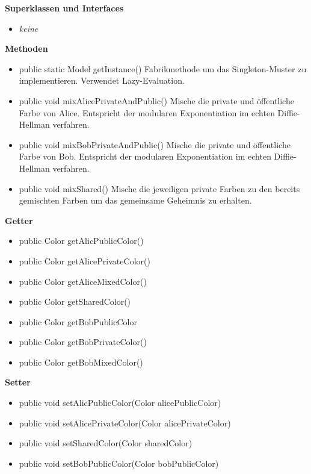 \documentclass{article}
\begin{document}
      \textbf{Superklassen und Interfaces}
      \begin{itemize}
        \item \textit{keine}
      \end{itemize}

      \textbf{Methoden}
      \begin{itemize}
        \item public static Model getInstance() \newline
            Fabrikmethode um das Singleton-Muster zu implementieren.
            Verwendet Lazy-Evaluation.
        \item public void mixAlicePrivateAndPublic() \newline
            Mische die private und öffentliche Farbe
            von Alice. Entspricht der modularen Exponentiation
            im echten Diffie-Hellman verfahren.
        \item public void mixBobPrivateAndPublic() \newline
            Mische die private und öffentliche Farbe
            von Bob. Entspricht der modularen Exponentiation
            im echten Diffie-Hellman verfahren.
        \item public void mixShared() \newline
            Mische die jeweiligen private Farben
            zu den bereits gemischten Farben
            um das gemeinsame Geheimnis zu erhalten.
      \end{itemize}

      \textbf{Getter}
      \begin{itemize}
        \item public Color getAlicPublicColor()
        \item public Color getAlicePrivateColor()
        \item public Color getAliceMixedColor()
        \item public Color getSharedColor()
        \item public Color getBobPublicColor
        \item public Color getBobPrivateColor()
        \item public Color getBobMixedColor()
      \end{itemize}

      \textbf{Setter}
      \begin{itemize}
        \item public void setAlicPublicColor(Color alicePublicColor)
        \item public void setAlicePrivateColor(Color alicePrivateColor)
        \item public void setSharedColor(Color sharedColor)
        \item public void setBobPublicColor(Color bobPublicColor)
      \end{itemize}
\end{document}
